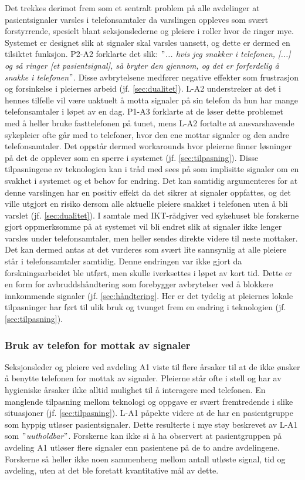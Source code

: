 \noindent
Det trekkes derimot frem som et sentralt problem på alle avdelinger at pasientsignaler varsles i telefonsamtaler da varslingen oppleves som svært forstyrrende, spesielt blant seksjonslederne og pleiere i roller hvor de ringer mye. Systemet er designet slik at signaler skal varsles uansett, og dette er dermed en tilsiktet funksjon. P2-A2 forklarte det slik: \textit{ $"$... hvis jeg snakker i telefonen, [...] og så ringer [et pasientsignal], så bryter den gjennom, og det er forferdelig å snakke i telefonen$"$}. Disse avbrytelsene medfører negative effekter som frustrasjon og forsinkelse i pleiernes arbeid (jf. \ref{sec:dualitet}). L-A2 understreker at det i hennes tilfelle vil være uaktuelt å motta signaler på sin telefon da hun har mange telefonsamtaler i løpet av en dag. P1-A3 forklarte at de løser dette problemet med å heller bruke fasttelefonen på tunet, mens L-A2 fortalte at ansvarshavende sykepleier ofte går med to telefoner, hvor den ene mottar signaler og den andre telefonsamtaler. Det oppstår dermed workarounds hvor pleierne finner løsninger på det de opplever som en sperre i systemet (jf. \ref{sec:tilpasning}). Disse tilpasningene av teknologien kan i tråd med \citet{Coiera07} sees på som implisitte signaler om en svakhet i systemet og et behov for endring. Det kan samtidig argumenteres for at denne varslingen har en positiv effekt da det sikrer at signaler oppfattes, og det ville utgjort en risiko dersom alle aktuelle pleiere snakket i telefonen uten å bli varslet (jf. \ref{sec:dualitet}). I samtale med IKT-rådgiver ved sykehuset ble forskerne gjort oppmerksomme på at systemet vil bli endret slik at signaler ikke lenger varsles under telefonsamtaler, men heller sendes direkte videre til neste mottaker. Det kan dermed antas at det vurderes som svært lite sannsynlig at alle pleiere står i telefonsamtaler samtidig. Denne endringen var ikke gjort da forskningsarbeidet ble utført, men skulle iverksettes i løpet av kort tid. Dette er en form for avbruddshåndtering som forebygger avbrytelser ved å blokkere innkommende signaler (jf. \ref{sec:håndtering}. Her er det tydelig at pleiernes lokale tilpasninger har ført til ulik bruk og tvunget frem en endring i teknologien (jf. \ref{sec:tilpasning}).

\subsubsection{Bruk av telefon for mottak av signaler}
Seksjonsleder og pleiere ved avdeling A1 viste til flere årsaker til at de ikke ønsker å benytte telefonen for mottak av signaler. Pleierne står ofte i stell og har av hygieniske årsaker ikke alltid mulighet til å interagere med telefonen. En manglende tilpasning mellom teknologi og oppgave er svært fremtredende i slike situasjoner (jf. \ref{sec:tilpasning}). L-A1 påpekte videre at de har en pasientgruppe som hyppig utløser pasientsignaler. Dette resulterte i mye støy beskrevet av L-A1 som \textit{$"$uutholdbar$"$}. Forskerne kan ikke si å ha observert at pasientgruppen på avdeling A1 utløser flere signaler enn pasientene på de to andre avdelingene. Forskerne så heller ikke noen sammenheng mellom antall utløste signal, tid og avdeling, uten at det ble foretatt kvantitative mål av dette.

